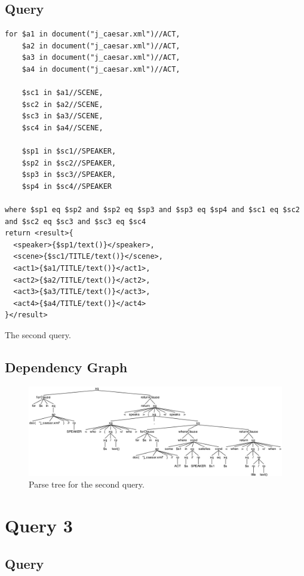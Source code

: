 \documentclass{article}
\begin{document}
\subsection{Query}

\begin{listing}[H]
\begin{verbatim}
for $a1 in document("j_caesar.xml")//ACT,
    $a2 in document("j_caesar.xml")//ACT,
    $a3 in document("j_caesar.xml")//ACT,
    $a4 in document("j_caesar.xml")//ACT,

    $sc1 in $a1//SCENE,
    $sc2 in $a2//SCENE,
    $sc3 in $a3//SCENE,
    $sc4 in $a4//SCENE,

    $sp1 in $sc1//SPEAKER,
    $sp2 in $sc2//SPEAKER,
    $sp3 in $sc3//SPEAKER,
    $sp4 in $sc4//SPEAKER

where $sp1 eq $sp2 and $sp2 eq $sp3 and $sp3 eq $sp4 and $sc1 eq $sc2 and $sc2 eq $sc3 and $sc3 eq $sc4
return <result>{
  <speaker>{$sp1/text()}</speaker>,
  <scene>{$sc1/TITLE/text()}</scene>,
  <act1>{$a1/TITLE/text()}</act1>,
  <act2>{$a2/TITLE/text()}</act2>,
  <act3>{$a3/TITLE/text()}</act3>,
  <act4>{$a4/TITLE/text()}</act4>
}</result>
\end{verbatim}
\caption{The second query.}\label{lst:query2}
\end{listing}

\subsection{Dependency Graph}
\begin{figure}[H]
  \centering
  \includegraphics[width=\linewidth]{imgs/antlr4_parse_tree_query_2.png}
  \caption{Parse tree for the second query.}\label{fig:parseTree2}
\end{figure}

\section{Query 3}
\subsection{Query}
\end{document}

